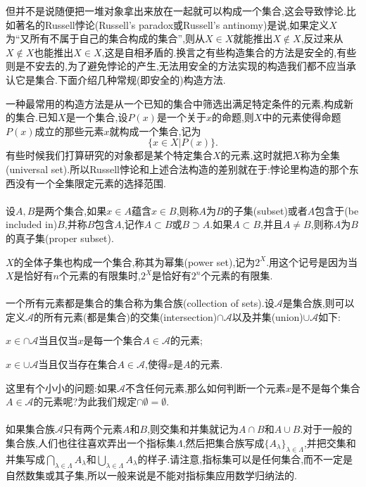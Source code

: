 但并不是说随便把一堆对象拿出来放在一起就可以构成一个集合,这会导致悖论.比如著名的Russell悖论(Russell's paradox或Russell's antinomy)是说,如果定义$X$为“又所有不属于自己的集合构成的集合”,则从$X\in X$就能推出$X\notin X$,反过来从$X\notin X$也能推出$X\in X$,这是自相矛盾的.换言之有些构造集合的方法是安全的,有些则是不安去的,为了避免悖论的产生,无法用安全的方法实现的构造我们都不应当承认它是集合.下面介绍几种常规(即安全的)构造方法.

一种最常用的构造方法是从一个已知的集合中筛选出满足特定条件的元素,构成新的集合.已知$X$是一个集合,设$P(x)$是一个关于$x$的命题,则$X$中的元素使得命题$P(x)$成立的那些元素$x$就构成一个集合,记为\begin{equation}
\{x\in X|P(x) \}.
\end{equation}
有些时候我们打算研究的对象都是某个特定集合$X$的元素,这时就把$X$称为全集(universal set).所以Russell悖论和上述合法构造的差别就在于:悖论里构造的那个东西没有一个全集限定元素的选择范围.
\\ \hspace*{\fill} \\%
设$A,B$是两个集合,如果$x\in A$蕴含$x\in B$,则称$A$为$B$的子集(subset)或者$A$包含于(be included in)$B$,并称$B$包含$A$,记作$A\subset B$或$B\supset A$.如果$A\subset B$,并且$A\neq B$,则称$A$为$B$的真子集(proper subset).

$X$的全体子集也构成一个集合,称其为幂集(power set),记为$2^X$.用这个记号是因为当$X$是恰好有$n$个元素的有限集时,$2^X$是恰好有$2^n$个元素的有限集.
\\ \hspace*{\fill} \\%
一个所有元素都是集合的集合称为集合族(collection of sets).设$\mathcal{A}$是集合族,则可以定义$\mathcal{A}$的所有元素(都是集合)的交集(intersection)$\cap\mathcal{A}$以及并集(union)$\cup\mathcal{A}$如下:
\begin{blist}
	\item $x\in\cap\mathcal{A}$当且仅当$x$是每一个集合$A\in\mathcal{A}$的元素;
	\item $x\in\cup\mathcal{A}$当且仅当存在集合$A\in\mathcal{A}$,使得$x$是$A$的元素.
\end{blist}

这里有个小小的问题:如果$\mathcal{A}$不含任何元素,那么如何判断一个元素$x$是不是每个集合$A\in\mathcal{A}$的元素呢?为此我们规定$\cap\emptyset = \emptyset$.
\\ \hspace*{\fill} \\%
如果集合族$\mathcal{A}$只有两个元素$A$和$B$,则交集和并集就记为$A\cap B$和$A\cup B$.对于一般的集合族,人们也往往喜欢弄出一个指标集$\Lambda$,然后把集合族写成$\{A_{\lambda}\}_{\lambda\in\Lambda}$,并把交集和并集写成$\bigcap_{\lambda\in\Lambda}A_{\lambda}$和$\bigcup_{\lambda\in\Lambda}A_{\lambda}$的样子.请注意,指标集可以是任何集合,而不一定是自然数集或其子集,所以一般来说是不能对指标集应用数学归纳法的.


